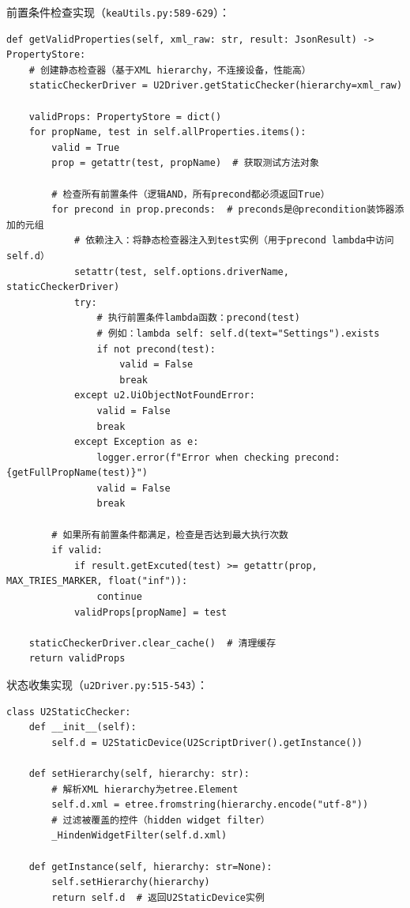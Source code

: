 \documentclass[a4paper, zihao=-4]{ctexart}
\newcommand{\bff}[1]{{\heiti #1}}
\begin{document}
\bff{前置条件检查实现}（\texttt{keaUtils.py:589-629}）：

\begin{lstlisting}
def getValidProperties(self, xml_raw: str, result: JsonResult) -> PropertyStore:
    # 创建静态检查器（基于XML hierarchy，不连接设备，性能高）
    staticCheckerDriver = U2Driver.getStaticChecker(hierarchy=xml_raw)
    
    validProps: PropertyStore = dict()
    for propName, test in self.allProperties.items():
        valid = True
        prop = getattr(test, propName)  # 获取测试方法对象
        
        # 检查所有前置条件（逻辑AND，所有precond都必须返回True）
        for precond in prop.preconds:  # preconds是@precondition装饰器添加的元组
            # 依赖注入：将静态检查器注入到test实例（用于precond lambda中访问self.d）
            setattr(test, self.options.driverName, staticCheckerDriver)
            try:
                # 执行前置条件lambda函数：precond(test)
                # 例如：lambda self: self.d(text="Settings").exists
                if not precond(test):
                    valid = False
                    break
            except u2.UiObjectNotFoundError:
                valid = False
                break
            except Exception as e:
                logger.error(f"Error when checking precond: {getFullPropName(test)}")
                valid = False
                break
        
        # 如果所有前置条件都满足，检查是否达到最大执行次数
        if valid:
            if result.getExcuted(test) >= getattr(prop, MAX_TRIES_MARKER, float("inf")):
                continue
            validProps[propName] = test
    
    staticCheckerDriver.clear_cache()  # 清理缓存
    return validProps
\end{lstlisting}

\bff{状态收集实现}（\texttt{u2Driver.py:515-543}）：

\begin{lstlisting}
class U2StaticChecker:
    def __init__(self):
        self.d = U2StaticDevice(U2ScriptDriver().getInstance())
    
    def setHierarchy(self, hierarchy: str):
        # 解析XML hierarchy为etree.Element
        self.d.xml = etree.fromstring(hierarchy.encode("utf-8"))
        # 过滤被覆盖的控件（hidden widget filter）
        _HindenWidgetFilter(self.d.xml)
    
    def getInstance(self, hierarchy: str=None):
        self.setHierarchy(hierarchy)
        return self.d  # 返回U2StaticDevice实例
\end{lstlisting}
\end{document}
